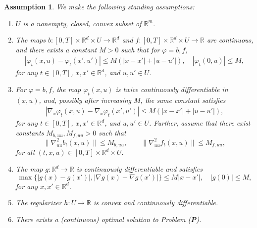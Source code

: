 \documentclass[10pt,a4paper]{amsart}
\newtheorem{assump}{Assumption}
\begin{document}
\begin{assump}\label{asp:main_asp}
    We make the following standing assumptions:
    \begin{enumerate}
        \item $U$ is a nonempty, closed, convex subset of $\mathbb{R}^m$.
        \item The maps $b: [0,T] \times \mathbb{R}^d \times U \to \mathbb{R}^d$ and $f: [0,T] \times \mathbb{R}^d \times U\to \mathbb{R}$ are continuous, and there exists a constant $M > 0$ such that for $\varphi = b, f$,
              \begin{align}
                  |\varphi_t(x, u) - \varphi_t(x', u')| \leq M(|x - x'| + |u - u'|), \quad |\varphi_t(0, u)| \leq M, \nonumber
              \end{align}
              for any $t \in [0,T]$, $x, x' \in \mathbb{R}^d$, and $u, u' \in U$.
        \item For $\varphi = b, f$, the map $\varphi_t(x,u)$ is twice continuously differentiable in $(x,u)$, and, possibly after increasing $M$, the same constant satisfies
              \begin{align}
                  |\nabla_x \varphi_t(x, u) - \nabla_x \varphi_t(x', u')| \leq M(|x - x'| + |u - u'|), \nonumber
              \end{align}
              for any $t \in [0,T]$, $x, x' \in \mathbb{R}^d$, and $u, u' \in U$.
              Further, assume that there exist constants $M_{b,uu}, M_{f,uu} > 0$ such that
\[
\|\nabla^2_{uu} b_t(x,u)\| \le M_{b,uu},
\qquad
\|\nabla^2_{uu} f_t(x,u)\| \le M_{f,uu},
\]
for all $(t,x,u) \in [0,T]\times\mathbb{R}^d\times U$.
        \item The map $g: \mathbb{R}^d \to \mathbb{R}$ is continuously differentiable and satisfies
        \[
        \max\{|g(x) - g(x')|, |\nabla g(x) - \nabla g(x')|\} \leq M|x - x'|, \quad |g(0)| \leq M,
        \]
        for any $x, x' \in \mathbb{R}^d$.
        \item The regularizer $h : U \to \mathbb{R}$ is convex and continuously differentiable.
        \item There exists a (continuous) optimal solution to Problem (\textbf{P}).
    \end{enumerate}
\end{assump}
\end{document}
